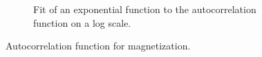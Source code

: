 \begin{figure}[ht]
\begin{subfigure}{0.45\textwidth}
        \caption{Fit of an exponential function to the autocorrelation function on a log scale.}
        \label{fig:acf_mag_fit}
    \end{subfigure}
    \caption{Autocorrelation function for magnetization.}
\end{figure}

